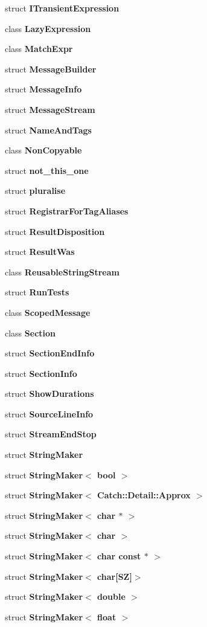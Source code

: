 \begin{DoxyCompactItemize}
\item 
struct \textbf{ I\+Transient\+Expression}
\item 
class \textbf{ Lazy\+Expression}
\item 
class \textbf{ Match\+Expr}
\item 
struct \textbf{ Message\+Builder}
\item 
struct \textbf{ Message\+Info}
\item 
struct \textbf{ Message\+Stream}
\item 
struct \textbf{ Name\+And\+Tags}
\item 
class \textbf{ Non\+Copyable}
\item 
struct \textbf{ not\+\_\+this\+\_\+one}
\item 
struct \textbf{ pluralise}
\item 
struct \textbf{ Registrar\+For\+Tag\+Aliases}
\item 
struct \textbf{ Result\+Disposition}
\item 
struct \textbf{ Result\+Was}
\item 
class \textbf{ Reusable\+String\+Stream}
\item 
struct \textbf{ Run\+Tests}
\item 
class \textbf{ Scoped\+Message}
\item 
class \textbf{ Section}
\item 
struct \textbf{ Section\+End\+Info}
\item 
struct \textbf{ Section\+Info}
\item 
struct \textbf{ Show\+Durations}
\item 
struct \textbf{ Source\+Line\+Info}
\item 
struct \textbf{ Stream\+End\+Stop}
\item 
struct \textbf{ String\+Maker}
\item 
struct \textbf{ String\+Maker$<$ bool $>$}
\item 
struct \textbf{ String\+Maker$<$ Catch\+::\+Detail\+::\+Approx $>$}
\item 
struct \textbf{ String\+Maker$<$ char $\ast$ $>$}
\item 
struct \textbf{ String\+Maker$<$ char $>$}
\item 
struct \textbf{ String\+Maker$<$ char const $\ast$ $>$}
\item 
struct \textbf{ String\+Maker$<$ char[\+S\+Z]$>$}
\item 
struct \textbf{ String\+Maker$<$ double $>$}
\item 
struct \textbf{ String\+Maker$<$ float $>$}

\end{DoxyCompactItemize}
